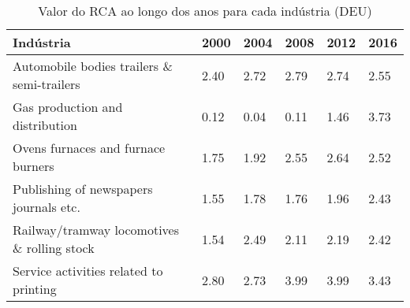 \begin{table}
\centering
\caption{Valor do RCA ao longo dos anos para cada indústria (DEU)}
\label{tab:ex3-tempo-DEU}
\begin{tabular}{p{6cm}p{1.5cm}p{1.5cm}p{1.5cm}p{1.5cm}p{1.5cm}}
\toprule
                                  Indústria & 2000 & 2004 & 2008 & 2012 & 2016 \\
\midrule
 Automobile bodies trailers \& semi-trailers & 2.40 & 2.72 & 2.79 & 2.74 & 2.55 \\
            Gas production and distribution & 0.12 & 0.04 & 0.11 & 1.46 & 3.73 \\
         Ovens furnaces and furnace burners & 1.75 & 1.92 & 2.55 & 2.64 & 2.52 \\
     Publishing of newspapers journals etc. & 1.55 & 1.78 & 1.76 & 1.96 & 2.43 \\
Railway/tramway locomotives \& rolling stock & 1.54 & 2.49 & 2.11 & 2.19 & 2.42 \\
     Service activities related to printing & 2.80 & 2.73 & 3.99 & 3.99 & 3.43 \\
\bottomrule
\end{tabular}
\end{table}
